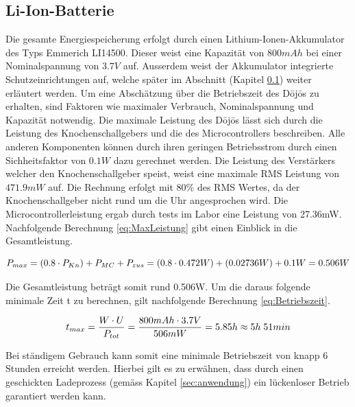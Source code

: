 \subsection{Li-Ion-Batterie}\label{sec:energiespeicher}

Die gesamte Energiespeicherung erfolgt durch einen Lithium-Ionen-Akkumulator des Typs Emmerich LI14500. Dieser weist eine Kapazität von $800mAh$ bei einer Nominalspannung von $3.7V$ auf. Ausserdem weist der Akkumulator integrierte Schutzeinrichtungen auf, welche später im Abschnitt  (Kapitel \ref{sec:energiespeicher}) weiter erläutert werden. Um eine Abschätzung über die Betriebszeit des Dōjōs zu erhalten, sind Faktoren wie maximaler Verbrauch, Nominalspannung und Kapazität notwendig. Die maximale Leistung des Dōjōs lässt sich durch die Leistung des Knochenschallgebers und die des Microcontrollers beschreiben. Alle anderen Komponenten können durch ihren geringen Betriebsstrom durch einen Sichheitsfaktor von $0.1W$ dazu gerechnet werden. Die Leistung des Verstärkers welcher den Knochenschallgeber speist, weist eine maximale RMS Leistung von $471.9mW$ auf. Die Rechnung erfolgt mit $80\%$ des RMS Wertes, da der Knochenschallgeber nicht rund um die Uhr angesprochen wird. Die Microcontrollerleistung ergab durch tests im Labor eine Leistung von 27.36mW. Nachfolgende Berechnung \ref{eq:MaxLeistung} gibt einen Einblick in die Gesamtleistung.

\begin{equation}
\centering
P_{max}=\left(0.8\cdot P_{Kn}\right)+P_{MC}+P_{zus}=(0.8\cdot 0.472W)+(0.02736W)+0.1W=0.506W
\label{eq:MaxLeistung}
\end{equation}

Die Gesamtleistung beträgt somit rund 0.506W. Um die daraus folgende minimale Zeit t zu berechnen, gilt nachfolgende Berechnung \ref{eq:Betriebszeit}.

\begin{equation}
\centering
t_{max}=\frac{W\cdot U}{P_{tot}}=\frac{800mAh \cdot 3.7V}{506mW}=5.85h\approx 5h \thickspace 51min
\label{eq:Betriebszeit}
\end{equation}

Bei ständigem Gebrauch kann somit eine minimale Betriebszeit von knapp 6 Stunden erreicht werden. Hierbei gilt es zu erwähnen, dass durch einen geschickten Ladeprozess (gemäss Kapitel \ref{sec:anwendung}) ein lückenloser Betrieb garantiert werden kann.


